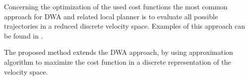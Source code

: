 Concerning the optimization of the used cost functions the most common approach for DWA and related local planner is to evaluate all possible trajectories in a reduced discrete velocity space. 
Examples of this approach can be found in \cite{kiss2012advanced}\cite{DBLP:conf/icra/Marder-EppsteinBFGK10}\cite{conf/icra/SederP07}. 

The proposed method extends the DWA approach, by using approximation algorithm to maximize the cost function in a discrete representation of the velocity space.





